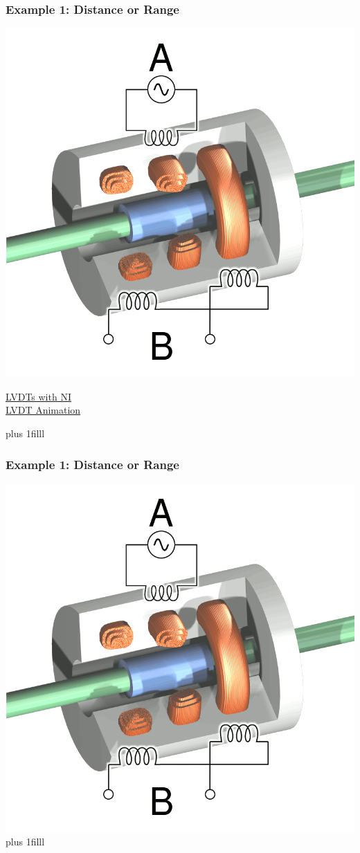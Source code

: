 \documentclass[fleqn]{beamer} %
\newcommand{\sectionIsubsectionIIItitle}{Example 1: Distance or Range}
\newcommand{\btVFill}{\vskip0pt plus 1filll}
\begin{document}
			\begin{frame} 
				\frametitle{\sectionIsubsectionIIItitle}

				 \includegraphics[scale=.2]{images/LVDT.png}

			 	\href{https://www.ni.com/en-us/innovations/white-papers/06/measuring-position-and-displacement-with-lvdts.html}{LVDTs with NI}\\
			 	\href{https://www.rdpe.com/us/hiw-lvdt.htm}{LVDT Animation}

			 	\btVFill


			\end{frame}	

			\begin{frame}
				\frametitle{\sectionIsubsectionIIItitle}
				\includegraphics[scale=.2]{images/LVDT.png}
				\btVFill

			\end{frame}
\end{document}
